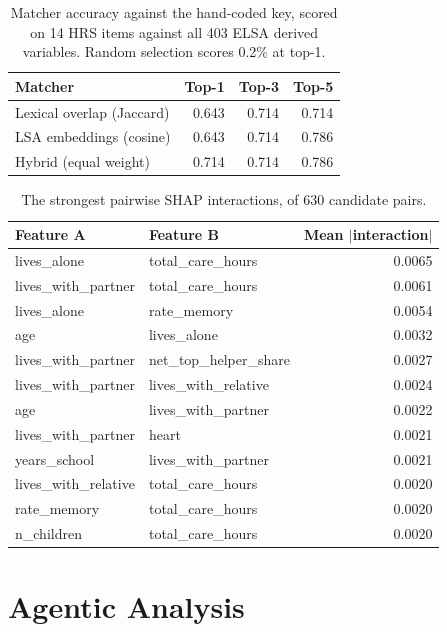 \documentclass[9pt,twoside]{pnas-new}
\begin{document}
\begin{table}[!ht]
\centering
\caption{Matcher accuracy against the hand-coded key, scored on 14 HRS items against all 403 ELSA derived variables. Random selection scores 0.2\% at top-1.}
\label{tab:b-match}
\small
\begin{tabular}{lrrr}
\toprule
Matcher & Top-1 & Top-3 & Top-5 \\
\midrule
Lexical overlap (Jaccard) & 0.643 & 0.714 & 0.714 \\
LSA embeddings (cosine) & 0.643 & 0.714 & 0.786 \\
Hybrid (equal weight) & 0.714 & 0.714 & 0.786 \\
\bottomrule
\end{tabular}
\end{table}

\begin{table}[!ht]
\centering
\caption{The strongest pairwise SHAP interactions, of 630 candidate pairs.}
\label{tab:b-shapinter}
\footnotesize
\begin{tabular}{llr}
\toprule
Feature A & Feature B & Mean $|$interaction$|$ \\
\midrule
lives\_alone & total\_care\_hours & 0.0065 \\
lives\_with\_partner & total\_care\_hours & 0.0061 \\
lives\_alone & rate\_memory & 0.0054 \\
age & lives\_alone & 0.0032 \\
lives\_with\_partner & net\_top\_helper\_share & 0.0027 \\
lives\_with\_partner & lives\_with\_relative & 0.0024 \\
age & lives\_with\_partner & 0.0022 \\
lives\_with\_partner & heart & 0.0021 \\
years\_school & lives\_with\_partner & 0.0021 \\
lives\_with\_relative & total\_care\_hours & 0.0020 \\
rate\_memory & total\_care\_hours & 0.0020 \\
n\_children & total\_care\_hours & 0.0020 \\
\bottomrule
\end{tabular}
\end{table}

\FloatBarrier

\section*{Agentic Analysis}
\end{document}
